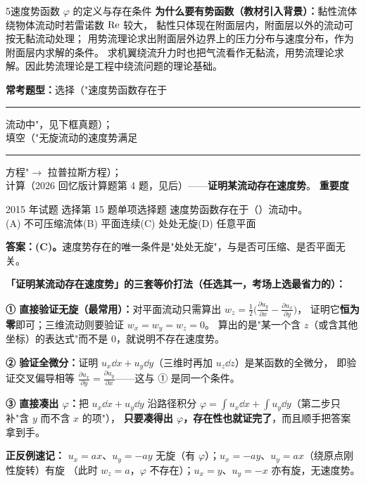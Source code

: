 \begin{kaodian}{5}{速度势函数 $\varphi$ 的定义与存在条件}
\textbf{为什么要有势函数（教材引入背景）：}黏性流体绕物体流动时若雷诺数 $\mathrm{Re}$ 较大，
黏性只体现在附面层内，附面层以外的流动可按无黏流动处理；
用势流理论求出附面层外边界上的压力分布与速度分布，作为附面层内求解的条件。
求机翼绕流升力时也把气流看作无黏流，用势流理论求解。因此势流理论是工程中绕流问题的理论基础。

\textbf{常考题型：}选择（"速度势函数存在于\rule{1.2cm}{0.4pt}流动中"，见下框真题）；\\
填空（"无旋流动的速度势满足\rule{1.8cm}{0.4pt}方程"$\to$ 拉普拉斯方程）；\\
计算（2026 回忆版计算题第 4 题，见后）——\textbf{证明某流动存在速度势}。
\textbf{重要度 }\quad{}\quad{}

\begin{zhenti}{2015 年试题 选择第 15 题}{单项选择题}
速度势函数存在于（\quad）流动中。\\
(A) 不可压缩流体\quad (B) 平面连续\quad (C) 处处无旋\quad (D) 任意平面
\end{zhenti}
\noindent\textbf{答案：(C)。}速度势存在的唯一条件是"处处无旋"，与是否可压缩、是否平面无关。

\begin{banfa}
\textbf{「证明某流动存在速度势」的三套等价打法（任选其一，考场上选最省力的）：}

\textbf{① 直接验证无旋（最常用）：}对平面流动只需算出 $w_z=\frac12\bigl(\frac{\partial u_y}{\partial x}-\frac{\partial u_x}{\partial y}\bigr)$，
证明它\textbf{恒为零}即可；三维流动则要验证 $w_x=w_y=w_z=0$。
算出的是"某一个含 $z$（或含其他坐标）的表达式"而不是 0，就说明不存在速度势。

\textbf{② 验证全微分：}证明 $u_x\dd x+u_y\dd y$（三维时再加 $u_z\dd z$）是某函数的全微分，
即验证交叉偏导相等 $\frac{\partial u_x}{\partial y}=\frac{\partial u_y}{\partial x}$——这与 ① 是同一个条件。

\textbf{③ 直接凑出 $\varphi$：}把 $u_x\dd x+u_y\dd y$ 沿路径积分
$\varphi=\int u_x\dd x+\int u_y\dd y$（第二步只补"含 $y$ 而不含 $x$ 的项"），
\textbf{只要凑得出 $\varphi$，存在性也就证完了}，而且顺手把答案拿到手。

\textbf{正反例速记：}
$u_x=ax$、$u_y=-ay$ 无旋（有 $\varphi$）；$u_x=-ay$、$u_y=ax$（绕原点刚性旋转）有旋
（此时 $w_z=a$，$\varphi$ 不存在）；$u_x=y$、$u_y=-x$ 亦有旋，无速度势。
\end{banfa}


\end{kaodian}
